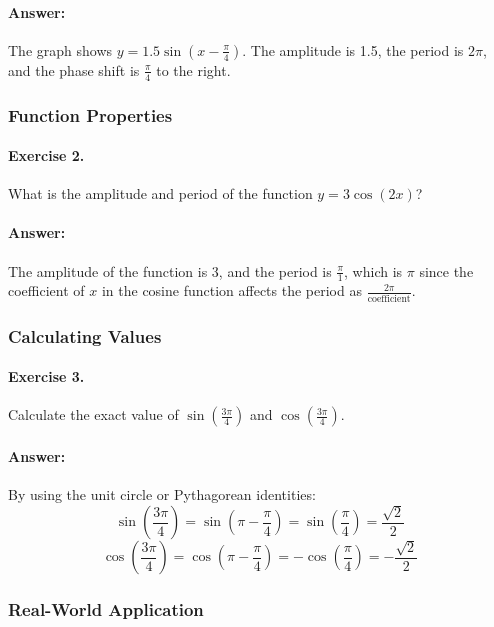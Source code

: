 \documentclass[a4paper,12pt]{book}
\begin{document}
\paragraph{Answer:} The graph shows \( y = 1.5\sin(x - \frac{\pi}{4}) \). The amplitude is 1.5, the period is \( 2\pi \), and the phase shift is \( \frac{\pi}{4} \) to the right.

\subsubsection*{Function Properties}

\paragraph{Exercise 2.} What is the amplitude and period of the function \( y = 3\cos(2x) \)?

\paragraph{Answer:} The amplitude of the function is 3, and the period is \( \frac{\pi}{1} \), which is \( \pi \) since the coefficient of \( x \) in the cosine function affects the period as \( \frac{2\pi}{\text{coefficient}} \).

\subsubsection*{Calculating Values}

\paragraph{Exercise 3.} Calculate the exact value of \( \sin(\frac{3\pi}{4}) \) and \( \cos(\frac{3\pi}{4}) \).

\paragraph{Answer:} By using the unit circle or Pythagorean identities:
\[ \sin(\frac{3\pi}{4}) = \sin(\pi - \frac{\pi}{4}) = \sin(\frac{\pi}{4}) = \frac{\sqrt{2}}{2} \]
\[ \cos(\frac{3\pi}{4}) = \cos(\pi - \frac{\pi}{4}) = -\cos(\frac{\pi}{4}) = -\frac{\sqrt{2}}{2} \]

\subsubsection*{Real-World Application}
\end{document}
